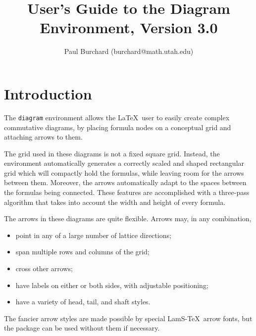 % 
%
%
\title{User's Guide to the Diagram Environment, Version 3.0}
\author{Paul Burchard (burchard@math.utah.edu)}
\def\tfrac#1#2{{\textstyle\frac{#1}{#2}}}

\maketitle

\section{Introduction}

The \verb"diagram" environment allows the \LaTeX\ user to easily
create complex commutative diagrams, by placing formula nodes on a
conceptual grid and attaching arrows to them.

The grid used in these diagrams is not a fixed square grid.
Instead, the environment automatically generates a correctly scaled
and shaped rectangular grid which will compactly hold the formulas,
while leaving room for the arrows between them.  Moreover, the
arrows automatically adapt to the spaces between the formulas
being connected.  These features are accomplished with a
three-pass algorithm that takes into account the width
and height of every formula.

The arrows in these diagrams are quite flexible.
Arrows may, in any combination,
\begin{itemize}
 \item point in any of a large number of lattice directions;
 \item span multiple rows and columns of the grid;
 \item cross other arrows;
 \item have labels on either or both sides,
    with adjustable positioning;
 \item have a variety of head, tail, and shaft styles.
\end{itemize}
The fancier arrow styles are made possible by special
LamS-\TeX\ arrow fonts, but the package can be used
without them if necessary.

